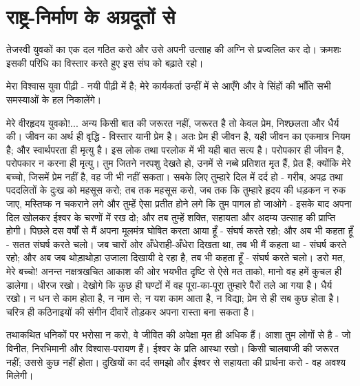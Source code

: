 \vskip 2pt


\section*{राष्ट्र-निर्माण के अग्रदूतों से}


तेजस्वी युवकों का एक दल गठित करो और उसे अपनी उत्साह की अग्नि से प्रज्वलित कर दो। क्रमशः इसकी परिधि का विस्तार करते हुए इस संघ को बढ़ाते रहो। 

\vskip 2pt

मेरा विश्वास युवा पीढ़ी - नयी पीढ़ी में है; मेरे कार्यकर्ता उन्हीं में से आएँगे और वे सिंहों की भाँति सभी समस्याओं के हल निकालेंगे। 

\vskip 2pt

मेरे वीरहृदय युवको!... अन्य किसी बात की जरूरत नहीं, जरूरत है तो केवल प्रेम, निश्छलता और धैर्य की। जीवन का अर्थ ही वृद्धि - विस्तार यानी प्रेम है। अतः प्रेम ही जीवन है, यही जीवन का एकमात्र नियम है; और स्वार्थपरता ही मृत्यु है। इस लोक तथा परलोक में भी यही बात सत्य है। परोपकार ही जीवन है, परोपकार न करना ही मृत्यु। तुम जितने नरपशु देखते हो, उनमें से नब्बे प्रतिशत मृत हैं, प्रेत हैं; क्योंकि मेरे बच्चो, जिसमें प्रेम नहीं है, वह जी भी नहीं सकता। सबके लिए तुम्हारे दिल में दर्द हो - गरीब, अपढ़ तथा पददलितों के दुःख को महसूस करो; तब तक महसूस करो, जब तक कि तुम्हारे हृदय की धड़कन न रुक जाए, मस्तिष्क न चकराने लगे और तुम्हें ऐसा प्रतीत होने लगे कि तुम पागल हो जाओगे - इसके बाद अपना दिल खोलकर ईश्वर के चरणों में रख दो; और तब तुम्हें शक्ति, सहायता और अदम्य उत्साह की प्राप्ति होगी। पिछले दस वर्षों से मैं अपना मूलमंत्र घोषित करता आया हूँ - संघर्ष करते रहो; और अब भी कहता हूँ - सतत संघर्ष करते चलो। जब चारों ओर अँधेराही-अँधेरा दिखता था, तब भी मैं कहता था - संघर्ष करते रहो; और अब जब थोड़ाथोड़ा उजाला दिखायी दे रहा है, तब भी कहता हूँ - संघर्ष करते चलो। डरो मत, मेरे बच्चो! अनन्त नक्षत्रखचित आकाश की ओर भयभीत दृष्टि से ऐसे मत ताको, मानो वह हमें कुचल ही डालेगा। धीरज रखो। देखोगे कि कुछ ही घण्टों में वह पूरा-का-पूरा तुम्हारे पैरों तले आ गया है। धैर्य रखो। न धन से काम होता है, न नाम से; न यश काम आता है, न विद्या; प्रेम से ही सब कुछ होता है। चरित्र ही कठिनाइयों की संगीन दीवारें तोड़कर अपना रास्ता बना सकता है। 

\vskip 2pt

तथाकथित धनिकों पर भरोसा न करो, वे जीवित की अपेक्षा मृत ही अधिक हैं। आशा तुम लोगों से है - जो विनीत, निरभिमानी और विश्वास-परायण हैं। ईश्वर के प्रति आस्था रखो। किसी चालबाजी की जरूरत नहीं; उससे कुछ नहीं होता। दुखियों का दर्द समझो और ईश्वर से सहायता की प्रार्थना करो - वह अवश्य मिलेगी। 

